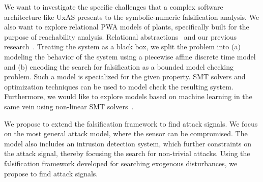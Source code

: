 
 We want to
investigate the specific challenges that a complex software
architecture like UxAS presents to the symbolic-numeric falsification
analysis. We also want to explore
relational PWA models of
plants, specifically built for the purpose of reachability analysis.
Relational abstractions~\cite{Tiwari2012} and our previous
research~\cite{zutshi2012timed}. Treating the system as a black box,
we split the problem into (a) modeling the behavior of the system
using a piecewise affine discrete time model and (b) encoding the
search for falsification as a bounded model checking problem. Such a
model is specialized for the given property.  SMT solvers and
optimization techniques can be used to model check the resulting
system. Furthermore, we would like to explore models based on machine
learning in the same vein using non-linear SMT
solvers~\cite{gao2013dreal}.



We propose to extend the falsification framework to find attack
signals. We focus on the most general attack model, where the sensor
can be compromised. The model also includes an intrusion detection
system, which further constraints on the attack signal, thereby
focusing the search for non-trivial attacks.  Using the falsification
framework developed for searching exogenous disturbances, we propose
to find attack signals.




